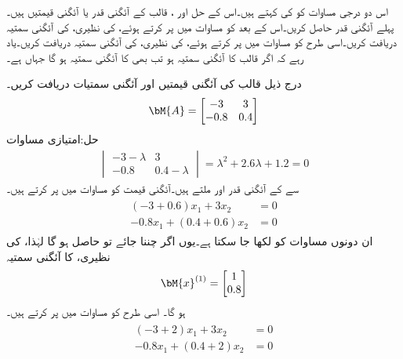 اس دو درجی مساوات کو  کی  کہتے ہیں۔اس کے حل  اور ، قالب  کے آئگنی قدر یا آئگنی قیمتیں ہیں۔پہلے آئگنی قدر حاصل کریں۔اس کے بعد  کو مساوات  میں پر کرتے ہوئے،  کی نظیری،  کی آئگنی سمتیہ  دریافت کریں۔اسی طرح  کو مساوات  میں پر کرتے ہوئے،  کی نظیری،  کی آئگنی سمتیہ  دریافت کریں۔یاد رہے کہ اگر  قالب  کا آئگنی سمتیہ ہو تب  بھی  کا آئگنی سمتیہ ہو گا جہاں  ہے۔

درج ذیل قالب کی آئگنی قیمتیں اور آئگنی سمتیات دریافت کریں۔
\begin{align*}
\bM{A}=
\begin{bmatrix}
-3& 3\\
-0.8&0.4
\end{bmatrix}
\end{align*}
حل:امتیازی مساوات
\begin{align*}
\begin{vmatrix}
-3-\lambda&3\\
-0.8&0.4-\lambda
\end{vmatrix}=\lambda^2+2.6\lambda+1.2=0
\end{align*}
سے  کے آئگنی قدر  اور  ملتے ہیں۔آئگنی قیمت  کو مساوات  میں پر کرتے ہیں۔
\begin{gather*}
\begin{aligned}
(-3+0.6)x_1+3x_2&=0\\
-0.8x_1+(0.4+0.6)x_2&=0
\end{aligned}
\end{gather*}
ان دونوں مساوات کو  لکھا جا سکتا ہے۔یوں اگر  چننا جائے تو  حاصل ہو گا لہٰذا،  کی نظیری،  کا آئگنی سمتیہ 
\begin{align*}
\bM{x}^{(1)}=
\begin{bmatrix}
1\\
0.8
\end{bmatrix}
\end{align*}
ہو گا۔ اسی طرح  کو مساوات  میں پر کرتے ہیں۔
\begin{gather*}
\begin{aligned}
(-3+2)x_1+3x_2&=0\\
-0.8x_1+(0.4+2)x_2&=0
\end{aligned}
\end{gather*}
